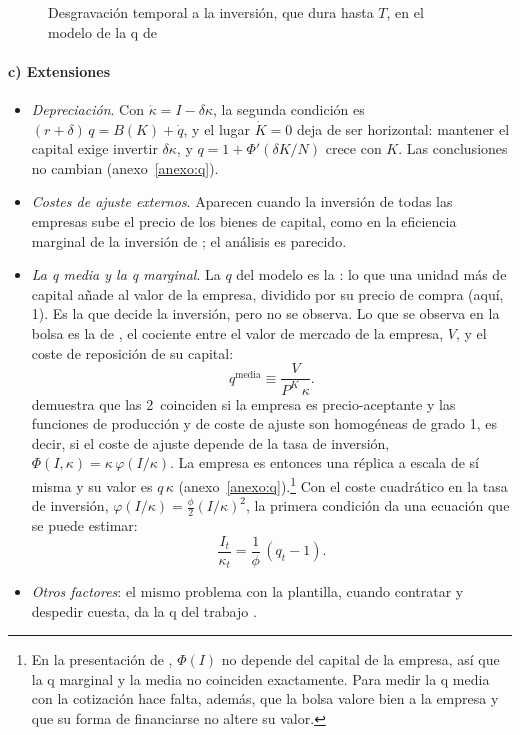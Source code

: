 \documentclass[11pt]{article}
\begin{document}
\begin{figure}[H]
\centering
\caption{Desgravación temporal a la inversión, que dura hasta $T$, en el modelo de la q de }\label{fig:q-desgravacion-temporal}
\end{figure}

\paragraph{c) Extensiones}

\begin{itemize}
\item \emph{Depreciación}. Con $\dot\kappa=I-\delta\kappa$, la segunda condición es $(r+\delta)\,q=B(K)+\dot q$, y el lugar $\dot K=0$ deja de ser horizontal: mantener el capital exige invertir $\delta\kappa$, y $q=1+\Phi'(\delta K/N)$ crece con $K$. Las conclusiones no cambian (anexo~\ref{anexo:q}).
\item \emph{Costes de ajuste externos}. Aparecen cuando la inversión de todas las empresas sube el precio de los bienes de capital, como en la eficiencia marginal de la inversión de ; el análisis es parecido.
\item \emph{La q media y la q marginal}. La $q$ del modelo es la : lo que una unidad más de capital añade al valor de la empresa, dividido por su precio de compra (aquí, 1). Es la que decide la inversión, pero no se observa. Lo que se observa en la bolsa es la  de \textcite{Tobin1969General}, el cociente entre el valor de mercado de la empresa, $V$, y el coste de reposición de su capital:
  \begin{equation*}
  q^{\mathrm{media}}\equiv\frac{V}{P^K\,\kappa}.
  \end{equation*}
  \textcite{Hayashi1982Tobin} demuestra que las 2~coinciden si la empresa es precio-aceptante y las funciones de producción y de coste de ajuste son homogéneas de grado 1, es decir, si el coste de ajuste depende de la tasa de inversión, $\Phi({I},\kappa)=\kappa\,\varphi(I/\kappa)$. La empresa es entonces una réplica a escala de sí misma y su valor es $q\,\kappa$ (anexo~\ref{anexo:q}).\footnote{En la presentación de \textcite{Romer2019Advanced}, $\Phi({I})$ no depende del capital de la empresa, así que la q marginal y la media no coinciden exactamente. Para medir la q media con la cotización hace falta, además, que la bolsa valore bien a la empresa y que su forma de financiarse no altere su valor\nocite{ModiglianiMiller1958Cost}.} Con el coste cuadrático en la tasa de inversión, $\varphi(I/\kappa)=\tfrac{\phi}{2}(I/\kappa)^2$, la primera condición da una ecuación que se puede estimar:
  \begin{equation*}
  \frac{I_t}{\kappa_t}=\frac{1}{\phi}\,(q_t-1).
  \end{equation*}
\item \emph{Otros factores}: el mismo problema con la plantilla, cuando contratar y despedir cuesta, da la q del trabajo .
\end{itemize}
\end{document}
